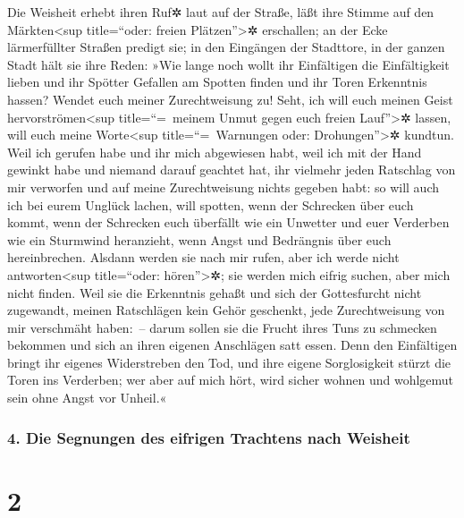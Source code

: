 Die Weisheit erhebt ihren Ruf✲ laut auf der Straße, läßt
ihre Stimme auf den Märkten\textless sup title=``oder: freien
Plätzen''\textgreater✲ erschallen; an der Ecke
lärmerfüllter Straßen predigt sie; in den Eingängen der Stadttore, in
der ganzen Stadt hält sie ihre Reden: »Wie lange noch
wollt ihr Einfältigen die Einfältigkeit lieben und ihr Spötter Gefallen
am Spotten finden und ihr Toren Erkenntnis hassen? Wendet
euch meiner Zurechtweisung zu! Seht, ich will euch meinen Geist
hervorströmen\textless sup title=``=~meinem Unmut gegen euch freien
Lauf''\textgreater✲ lassen, will euch meine Worte\textless sup
title=``=~Warnungen oder: Drohungen''\textgreater✲ kundtun.
Weil ich gerufen habe und ihr mich abgewiesen habt, weil
ich mit der Hand gewinkt habe und niemand darauf geachtet hat,
ihr vielmehr jeden Ratschlag von mir verworfen und auf
meine Zurechtweisung nichts gegeben habt: so will auch
ich bei eurem Unglück lachen, will spotten, wenn der Schrecken über euch
kommt, wenn der Schrecken euch überfällt wie ein Unwetter
und euer Verderben wie ein Sturmwind heranzieht, wenn Angst und
Bedrängnis über euch hereinbrechen. Alsdann werden sie
nach mir rufen, aber ich werde nicht antworten\textless sup
title=``oder: hören''\textgreater✲; sie werden mich eifrig suchen, aber
mich nicht finden. Weil sie die Erkenntnis gehaßt und
sich der Gottesfurcht nicht zugewandt, meinen Ratschlägen
kein Gehör geschenkt, jede Zurechtweisung von mir verschmäht haben:~--
darum sollen sie die Frucht ihres Tuns zu schmecken
bekommen und sich an ihren eigenen Anschlägen satt essen.
Denn den Einfältigen bringt ihr eigenes Widerstreben den
Tod, und ihre eigene Sorglosigkeit stürzt die Toren ins Verderben;
wer aber auf mich hört, wird sicher wohnen und wohlgemut
sein ohne Angst vor Unheil.«

\hypertarget{die-segnungen-des-eifrigen-trachtens-nach-weisheit}{%
\subsubsection{4. Die Segnungen des eifrigen Trachtens nach
Weisheit}\label{die-segnungen-des-eifrigen-trachtens-nach-weisheit}}

\hypertarget{section-1}{%
\section{2}\label{section-1}}

